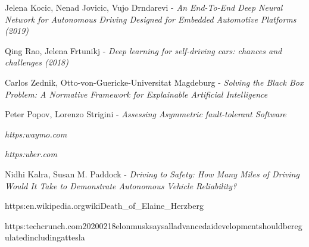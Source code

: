 \begin{thebibliography}{9}
Jelena Kocic, Nenad Jovicic, Vujo Drndarevi - \textit{An End-To-End Deep Neural Network for Autonomous Driving Designed for Embedded Automotive Platforms (2019)}

Qing Rao, Jelena Frtunikj - \textit{Deep learning for self-driving cars: chances and challenges (2018)}

Carlos Zednik, Otto-von-Guericke-Universitat Magdeburg - \textit{Solving the Black Box Problem: A Normative Framework for Explainable Artificial Intelligence}

Peter Popov, Lorenzo Strigini - \textit{Assessing Asymmetric fault-tolerant Software}

\textit{https:\/\/waymo.com\/}

\textit{https:\/\/uber.com\/}

Nidhi Kalra, Susan M. Paddock - \textit{Driving to Safety: How Many Miles of Driving Would It Take to Demonstrate Autonomous Vehicle Reliability?}

https:\/\/en.wikipedia.org\/wiki\/Death\_of\_Elaine\_Herzberg

https:\/\/techcrunch.com\/2020\/02\/18\/elon\-musk\-says\-all\-advanced\-ai\-development\-should\-be\-regulated\-including\-at\-tesla


\end{thebibliography}